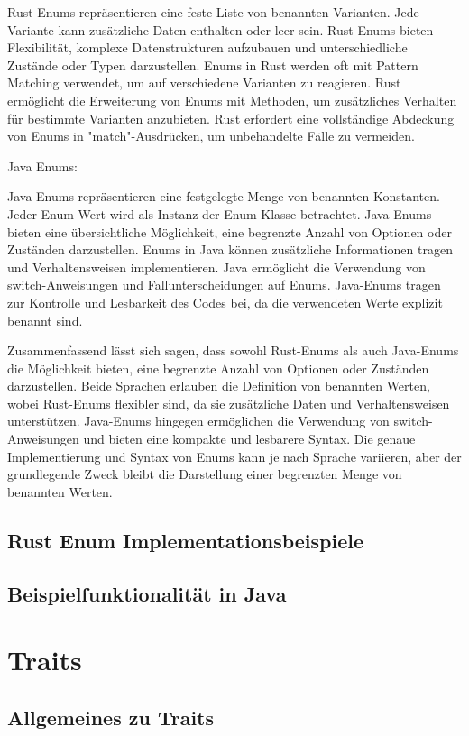 \documentclass[a4paper, 1ppt]{article}
\begin{document}
    Rust-Enums repräsentieren eine feste Liste von benannten Varianten.
    Jede Variante kann zusätzliche Daten enthalten oder leer sein.
    Rust-Enums bieten Flexibilität, komplexe Datenstrukturen aufzubauen und unterschiedliche Zustände oder Typen darzustellen.
    Enums in Rust werden oft mit Pattern Matching verwendet, um auf verschiedene Varianten zu reagieren.
    Rust ermöglicht die Erweiterung von Enums mit Methoden, um zusätzliches Verhalten für bestimmte Varianten anzubieten.
    Rust erfordert eine vollständige Abdeckung von Enums in "match"-Ausdrücken, um unbehandelte Fälle zu vermeiden.

Java Enums:

    Java-Enums repräsentieren eine festgelegte Menge von benannten Konstanten.
    Jeder Enum-Wert wird als Instanz der Enum-Klasse betrachtet.
    Java-Enums bieten eine übersichtliche Möglichkeit, eine begrenzte Anzahl von Optionen oder Zuständen darzustellen.
    Enums in Java können zusätzliche Informationen tragen und Verhaltensweisen implementieren.
    Java ermöglicht die Verwendung von switch-Anweisungen und Fallunterscheidungen auf Enums.
    Java-Enums tragen zur Kontrolle und Lesbarkeit des Codes bei, da die verwendeten Werte explizit benannt sind.

Zusammenfassend lässt sich sagen, dass sowohl Rust-Enums als auch Java-Enums die Möglichkeit bieten, eine begrenzte Anzahl von Optionen oder Zuständen darzustellen. Beide Sprachen erlauben die Definition von benannten Werten, wobei Rust-Enums flexibler sind, da sie zusätzliche Daten und Verhaltensweisen unterstützen. Java-Enums hingegen ermöglichen die Verwendung von switch-Anweisungen und bieten eine kompakte und lesbarere Syntax. Die genaue Implementierung und Syntax von Enums kann je nach Sprache variieren, aber der grundlegende Zweck bleibt die Darstellung einer begrenzten Menge von benannten Werten.
\subsection{Rust Enum Implementationsbeispiele}
\subsection{Beispielfunktionalität in Java}
\section{Traits}
\subsection{Allgemeines zu Traits}
\end{document}
